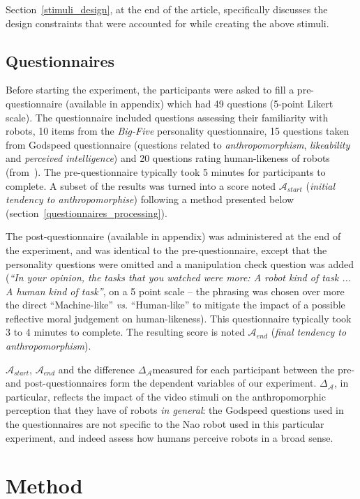 \documentclass[lettersize, noapacite, twoside, HRI]{apa_HRI}
\newcommand{\vs}{\textit{vs.}\xspace}
\newcommand{\anti}{{$\mathcal{A}_{start}$\xspace}}
\newcommand{\antf}{{$\mathcal{A}_{end}$\xspace}}
\newcommand{\deltaant}{{$\Delta_{\mathcal{A}}$\xspace}}
\begin{document}
Section~\ref{stimuli_design}, at the end of the article, specifically discusses
the design constraints that were accounted for while creating the above stimuli.

\subsection{Questionnaires}

Before starting the experiment, the participants were asked to fill a
pre-questionnaire (available in appendix) which had 49 questions (5-point Likert scale). The
questionnaire included questions assessing their familiarity with robots, 10
items from the \emph{Big-Five} personality questionnaire, 15 questions taken from
Godspeed questionnaire (questions related to \emph{anthropomorphism},
\emph{likeability} and \emph{perceived intelligence}) and 20 questions rating
human-likeness of robots (from~\cite{ruijten_introducing_2014}). The pre-questionnaire
typically took 5 minutes for participants to complete. A subset of the results was turned into
a score noted \anti{} (\emph{initial tendency to anthropomorphise}) following a
method presented below (section~\ref{questionnaires_processing}).

The post-questionnaire (available in appendix) was administered at the end of the experiment, and was
identical to the pre-questionnaire, except that the personality questions were omitted and a
manipulation check question was added (\emph{``In your opinion, the tasks that
you watched were more: A robot kind of task ... A human kind of task''}, on a 5
point scale -- the phrasing was chosen over more the direct ``Machine-like'' \vs
``Human-like'' to mitigate the impact of a possible reflective moral judgement
on human-likeness).
This questionnaire typically took 3 to 4 minutes to complete. The resulting score is
noted \antf{} (\emph{final tendency to anthropomorphism}).

\anti{}, \antf{} and the difference \deltaant measured for each participant between
the pre- and post-questionnaires form the dependent variables of our experiment.
\deltaant, in particular, reflects the impact of the video stimuli on the
anthropomorphic perception that they have of robots \emph{in general}: the
Godspeed questions used in the questionnaires are not specific to the Nao robot
used in this particular experiment, and indeed assess how humans perceive robots
in a broad sense.

\section{Method}
\end{document}
